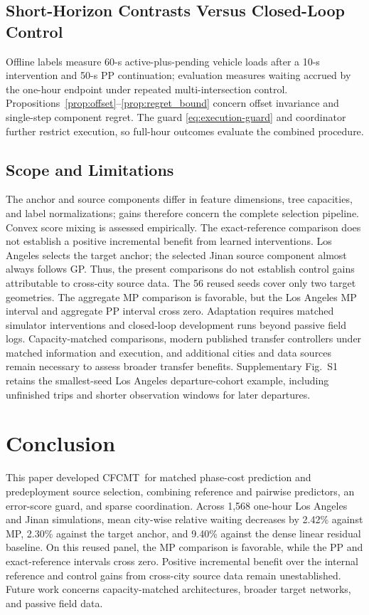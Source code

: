 \documentclass[letterpaper,journal]{IEEEtran}
\newcommand{\method}{CFCMT}
\begin{document}
\subsection{Short-Horizon Contrasts Versus Closed-Loop Control}
Offline labels measure 60-s active-plus-pending vehicle loads after a 10-s intervention and 50-s PP continuation; evaluation measures waiting accrued by the one-hour endpoint under repeated multi-intersection control. Propositions~\ref{prop:offset}--\ref{prop:regret_bound} concern offset invariance and single-step component regret. The guard \eqref{eq:execution-guard} and coordinator further restrict execution, so full-hour outcomes evaluate the combined procedure.

\subsection{Scope and Limitations}
The anchor and source components differ in feature dimensions, tree capacities, and label normalizations; gains therefore concern the complete selection pipeline. Convex score mixing is assessed empirically. The exact-reference comparison does not establish a positive incremental benefit from learned interventions. Los Angeles selects the target anchor; the selected Jinan source component almost always follows GP. Thus, the present comparisons do not establish control gains attributable to cross-city source data. The 56 reused seeds cover only two target geometries. The aggregate MP comparison is favorable, but the Los Angeles MP interval and aggregate PP interval cross zero. Adaptation requires matched simulator interventions and closed-loop development runs beyond passive field logs. Capacity-matched comparisons, modern published transfer controllers under matched information and execution, and additional cities and data sources remain necessary to assess broader transfer benefits. Supplementary Fig.~S1 retains the smallest-seed Los Angeles departure-cohort example, including unfinished trips and shorter observation windows for later departures.

\section{Conclusion}
\label{sec:conclusion}
This paper developed \method\ for matched phase-cost prediction and predeployment source selection, combining reference and pairwise predictors, an error-score guard, and sparse coordination. Across 1,568 one-hour Los Angeles and Jinan simulations, mean city-wise relative waiting decreases by 2.42\% against MP, 2.30\% against the target anchor, and 9.40\% against the dense linear residual baseline. On this reused panel, the MP comparison is favorable, while the PP and exact-reference intervals cross zero. Positive incremental benefit over the internal reference and control gains from cross-city source data remain unestablished. Future work concerns capacity-matched architectures, broader target networks, and passive field data.
\end{document}
